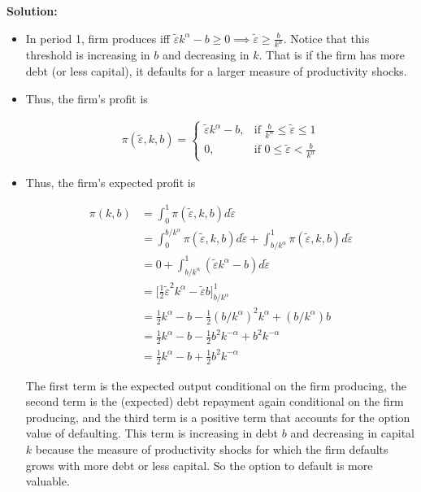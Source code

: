 \documentclass{article}
\begin{document}
\textbf{Solution:}

\begin{itemize}

\item In period 1, firm produces iff $\tilde \varepsilon k^\alpha - b \ge 0 \implies \tilde \varepsilon \ge \frac{b}{k^\alpha}$. Notice that this threshold is increasing in $b$ and decreasing in $k$. That is if the firm has more debt (or less capital), it defaults for a larger measure of productivity shocks.

\item Thus, the firm's profit is

\begin{align*}
\pi(\tilde \varepsilon, k, b) = \begin{cases} \tilde \varepsilon k^\alpha - b, & \text{if }  \frac{b}{k^\alpha} \le \tilde\varepsilon \le 1 \\ 0, & \text{if } 0 \le \tilde\varepsilon < \frac{b}{k^\alpha} \end{cases}
\end{align*}

\item Thus, the firm's expected profit is

\begin{align*}
\pi(k,b) 
&= \int_0^1 \pi(\tilde \varepsilon, k, b) d \tilde \varepsilon\\
&= \int_{0}^{b/k^\alpha}  \pi(\tilde \varepsilon, k, b) d \tilde \varepsilon  + \int_{b/k^\alpha}^1 \pi(\tilde \varepsilon, k, b) d \tilde \varepsilon \\  &= 0+\int_{b/k^\alpha}^1 (\tilde \varepsilon k^\alpha - b) d \tilde \varepsilon \\
&= \Bigg[\frac{1}{2}\tilde \varepsilon^2 k^\alpha -\tilde \varepsilon b \Bigg]_{b/k^\alpha}^1\\
&= \frac{1}{2} k^\alpha - b - \frac{1}{2}(b/k^\alpha)^2 k^\alpha + (b/k^\alpha) b\\
&= \frac{1}{2} k^\alpha - b - \frac{1}{2}b^2 k^{-\alpha} + b^2 k^{-\alpha}\\
&= \frac{1}{2} k^\alpha - b + \frac{1}{2}b^2 k^{-\alpha}
\end{align*}

The first term is the expected output conditional on the firm producing, the second term is the (expected) debt repayment again conditional on the firm producing, and the third term is a positive term that accounts for the option value of defaulting. This term is increasing in debt $b$ and decreasing in capital $k$ because the measure of productivity shocks for which the firm defaults grows with more debt or less capital. So the option to default is more valuable.


\end{itemize}
\end{document}
